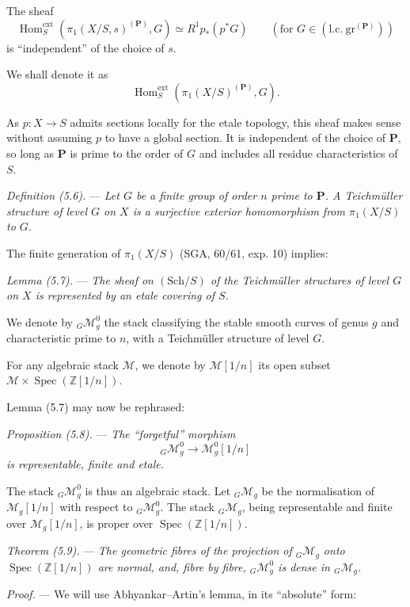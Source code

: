 \documentclass[10pt]{article}
\newcommand{\Spec}{\operatorname{Spec}}
\newcommand{\Hom}{\operatorname{Hom}}
\begin{document}
The sheaf
\[
\Hom_S^{\mathrm{ext}}(\pi_1(X/S,s)^{(\mathbf P)},G)\simeq R^1p_*(p^*G)
\qquad ( \text{for }G\in(\mathrm{l.c.}\ \mathrm{gr}^{(\mathbf P)}) )
\]
is ``independent'' of the choice of $s$.

We shall denote it as
\[
\Hom_S^{\mathrm{ext}}(\pi_1(X/S)^{(\mathbf P)},G).
\]

As $p:X\to S$ admits sections locally for the etale topology, this sheaf makes sense without assuming $p$ to have a global section. It is independent of the choice of $\mathbf P$, so long as $\mathbf P$ is prime to the order of $G$ and includes all residue characteristics of $S$.

\medskip
\noindent\emph{Definition (5.6).} --- \emph{Let $G$ be a finite group of order $n$ prime to $\mathbf P$. A Teichmüller structure of level $G$ on $X$ is a surjective exterior homomorphism from $\pi_1(X/S)$ to $G$.}

The finite generation of $\pi_1(X/S)$ (SGA, 60/61, exp. 10) implies:

\medskip
\noindent\emph{Lemma (5.7).} --- \emph{The sheaf on $(\mathrm{Sch}/S)$ of the Teichmüller structures of level $G$ on $X$ is represented by an etale covering of $S$.}

We denote by ${}_G\mathcal M_g^0$ the stack classifying the stable smooth curves of genus $g$ and characteristic prime to $n$, with a Teichmüller structure of level $G$.

For any algebraic stack $\mathscr M$, we denote by $\mathscr M[1/n]$ its open subset $\mathscr M\times\Spec(\mathbb Z[1/n])$.

Lemma (5.7) may now be rephrased:

\medskip
\noindent\emph{Proposition (5.8).} --- \emph{The ``forgetful'' morphism}
\[
{}_G\mathcal M_g^0\longrightarrow \mathcal M_g^0[1/n]
\]
\emph{is representable, finite and etale.}

The stack ${}_G\mathcal M_g^0$ is thus an algebraic stack. Let ${}_G\mathcal M_g$ be the normalisation of $\mathcal M_g[1/n]$ with respect to ${}_G\mathcal M_g^0$. The stack ${}_G\mathcal M_g$, being representable and finite over $\mathcal M_g[1/n]$, is proper over $\Spec(\mathbb Z[1/n])$.

\medskip
\noindent\emph{Theorem (5.9).} --- \emph{The geometric fibres of the projection of ${}_G\mathcal M_g$ onto $\Spec(\mathbb Z[1/n])$ are normal, and, fibre by fibre, ${}_G\mathcal M_g^0$ is dense in ${}_G\mathcal M_g$.}

\noindent\emph{Proof.} --- We will use Abhyankar--Artin's lemma, in its ``absolute'' form:
\end{document}
